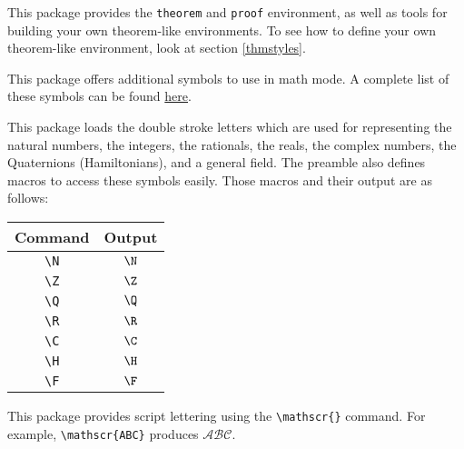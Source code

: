 \documentclass[letterpaper,12pt]{article}
\begin{document}
\begin{description}[align=margin,labelsep=0pt,leftmargin=0pt,style=multiline,labelwidth=63pt]
{}
\item[\href{http://mirror.jmu.edu/pub/CTAN/macros/latex/required/amslatex/amscls/doc/amsthdoc.pdf}{\texttt{amsthm}}] This package provides the \texttt{theorem} and \texttt{proof} environment, as well as tools for building your own theorem-like environments. To see how to define your own theorem-like environment, look at section \ref{thmstyles}.


{}
\item[\href{http://ctan.math.utah.edu/ctan/tex-archive/fonts/amsfonts/doc/amsfndoc.pdf}{\texttt{amssymb}}] This package offers additional symbols to use in math mode. A complete list of these symbols can be found \href{http://milde.users.sourceforge.net/LUCR/Math/mathpackages/amssymb-symbols.pdf}{here}.


{}
\item[\href{http://ctan.mirrors.hoobly.com/fonts/doublestroke/dsdoc.pdf}{\texttt{dsfont}}] This package loads the double stroke letters which are used for representing the natural numbers, the integers, the rationals, the reals, the complex numbers, the Quaternions (Hamiltonians), and a general field. The preamble also defines macros to access these symbols easily. Those macros and their output are as follows:

\begin{center}
\begin{tabular}{c|c}
Command & Output \\ \hline
\verb|\N| & $\N$ \\
\verb|\Z| & $\Z$ \\
\verb|\Q| & $\Q$ \\
\verb|\R| & $\R$ \\
\verb|\C| & $\C$ \\
\verb|\H| & $\H$ \\
\verb|\F| & $\F$ \\
\end{tabular}
\end{center}


{}
\item[\href{http://ftp.math.purdue.edu/mirrors/ctan.org/macros/latex/contrib/jknappen/mathrsfs.rme}{\texttt{mathrsfs}}] This package provides script lettering using the \verb|\mathscr{}| command. For example, \verb|\mathscr{ABC}| produces $\mathscr{ABC}$.



\end{description}
\end{document}
